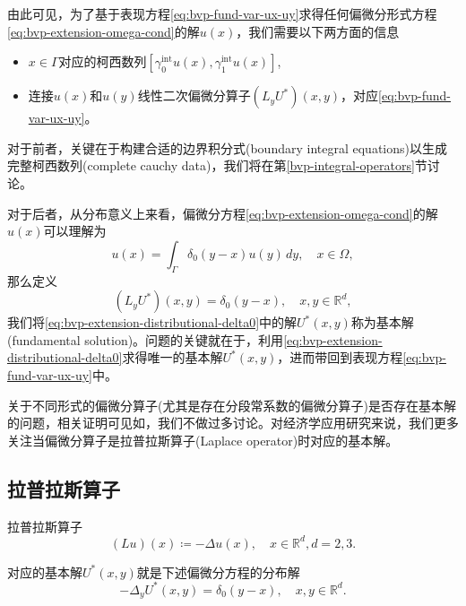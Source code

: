 由此可见，为了基于表现方程\eqref{eq:bvp-fund-var-ux-uy}求得任何偏微分形式方程\eqref{eq:bvp-extension-omega-cond}的解$u(x)$，我们需要以下两方面的信息
\begin{itemize}
  \item $x \in \Gamma$对应的柯西数列$\left[ \gamma_{0}^{\text{int}} u(x) , \gamma_{1}^{\text{int}} u(x) \right]$,
  \item 连接$u(x)$和$u(y)$线性二次偏微分算子$\left(L_y U^{*} \right) (x,y)$，对应\eqref{eq:bvp-fund-var-ux-uy}。
\end{itemize}

对于前者，关键在于构建合适的边界积分式(boundary integral equations)以生成完整柯西数列(complete cauchy data)，我们将在第\ref{bvp-integral-operators}节讨论。

对于后者，从分布意义上来看，偏微分方程\eqref{eq:bvp-extension-omega-cond}的解$u(x)$可以理解为
\begin{equation*}
  u(x) = \int_{\Gamma} \delta_0 (y-x) u(y) \, dy, \quad x \in \Omega
,
\end{equation*}
那么定义
\begin{equation}
  \label{eq:bvp-extension-distributional-delta0}
  \left( L_y U^{*} \right) (x,y) = \delta_{0}(y-x), \quad x,y \in \mathbb{R}^{d},
\end{equation}
我们将\eqref{eq:bvp-extension-distributional-delta0}中的解$U^{*}(x,y)$称为基本解(fundamental solution)。问题的关键就在于，利用\eqref{eq:bvp-extension-distributional-delta0}求得唯一的基本解$U^{*}(x,y)$，进而带回到表现方程\eqref{eq:bvp-fund-var-ux-uy}中。

关于不同形式的偏微分算子(尤其是存在分段常系数的偏微分算子)是否存在基本解的问题，相关证明可见如\cite{Hormander:1983hm, Hormander:1983cb, Hormander:1994iv, Hormander:1994ee}，我们不做过多讨论。对经济学应用研究来说，我们更多关注当偏微分算子是拉普拉斯算子(Laplace operator)时对应的基本解。

\subsection{拉普拉斯算子}
拉普拉斯算子
\begin{equation*}
  (L u)(x) \coloneqq   - \Delta u(x), \quad x \in \mathbb{R}^d, d = 2,3.
\end{equation*}

对应的基本解$U^{*}(x,y)$就是下述偏微分方程的分布解
\begin{equation*}
  - \Delta_{y} U^{*} (x,y) = \delta_0(y-x), \quad x,y \in \mathbb{R}^d.
\end{equation*}

